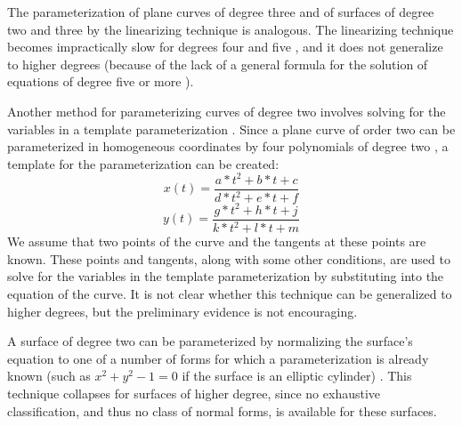 The parameterization of plane curves of degree three and of surfaces of
degree two and three by the linearizing technique is analogous.
The linearizing technique becomes impractically slow for 
degrees four and five \cite{bajcomm},
and it does not generalize to higher degrees (because of the lack of a
general formula for the solution of equations of degree five or 
more \cite{hernstein}).

Another method for parameterizing curves of degree two
involves solving for the variables in a 
template parameterization \cite{hopcroft-hoffmann}.
Since a plane curve of order two can be parameterized in homogeneous
coordinates by four polynomials of degree two \cite{abba1},
a template for the parameterization can be created:
\[ x(t) = \frac{a*t^{2} + b*t + c}{d*t^{2} + e*t + f} \]
\[ y(t) = \frac{g*t^{2} + h*t + j}{k*t^{2} + l*t + m} \]
We assume that two points of the curve and the tangents at these
points are known.
These points and tangents, along with some other conditions, are used to
solve for the variables in the template parameterization by
substituting into the equation of the curve.
It is not clear whether this technique can be generalized to higher
degrees, but the preliminary evidence is not encouraging.

A surface of degree two can be parameterized by normalizing the surface's
equation
to one of a number of forms for which a parameterization is already known
(such as \( x^{2} + y^{2} - 1 = 0 \) if the surface 
is an elliptic cylinder) \cite{levin76}.
This technique collapses for surfaces of higher degree,
since no exhaustive classification, and thus no class of normal forms, 
is available for these surfaces.
